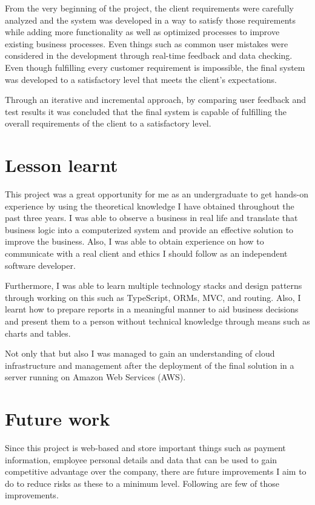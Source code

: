 \documentclass[12pt]{report}
\begin{document}
From the very beginning of the project, the client requirements were carefully analyzed and the system was developed in a way to satisfy those requirements while adding more functionality as well as optimized processes to improve existing business processes. Even things such as common user mistakes were considered in the development through real-time feedback and data checking. Even though fulfilling every customer requirement is impossible, the final system was developed to a satisfactory level that meets the client's expectations.

Through an iterative and incremental approach, by comparing user feedback and test results it was concluded that the final system is capable of fulfilling the overall requirements of the client to a satisfactory level.

\section{Lesson learnt}
This project was a great opportunity for me as an undergraduate to get hands-on experience by using the theoretical knowledge I have obtained throughout the past three years. I was able to observe a business in real life and translate that business logic into a computerized system and provide an effective solution to improve the business. Also, I was able to obtain experience on how to communicate with a real client and ethics I should follow as an independent software developer.

Furthermore, I was able to learn multiple technology stacks and design patterns through working on this such as TypeScript, ORMs, MVC, and routing. Also, I learnt how to prepare reports in a meaningful manner to aid business decisions and present them to a person without technical knowledge through means such as charts and tables.

Not only that but also I was managed to gain an understanding of cloud infrastructure and management after the deployment of the final solution in a server running on Amazon Web Services (AWS).

\section{Future work}
Since this project is web-based and store important things such as payment information, employee personal details and data that can be used to gain competitive advantage over the company, there are future improvements I aim to do to reduce risks as these to a minimum level. Following are few of those improvements.
\end{document}

